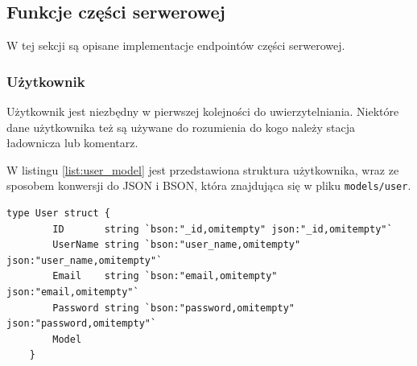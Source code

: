 % 
\subsection{Funkcje części serwerowej}
W tej sekcji są opisane implementacje endpointów części serwerowej.
% 
\subsubsection{Użytkownik}
Użytkownik jest niezbędny w pierwszej kolejności do uwierzytelniania. Niektóre dane użytkownika też są używane do rozumienia do kogo należy stacja ładownicza lub komentarz.

W listingu \ref{list:user_model} jest przedstawiona struktura użytkownika, wraz ze sposobem konwersji do JSON i BSON, która znajdująca się w pliku \texttt{models/user}.
\begin{lstlisting}[label=list:user_model,caption=Model danych użytkownika,basicstyle=\tiny\ttfamily]
    type User struct {
        ID       string `bson:"_id,omitempty" json:"_id,omitempty"`
        UserName string `bson:"user_name,omitempty" json:"user_name,omitempty"`
        Email    string `bson:"email,omitempty" json:"email,omitempty"`
        Password string `bson:"password,omitempty" json:"password,omitempty"`
        Model
    }
\end{lstlisting}

% 

